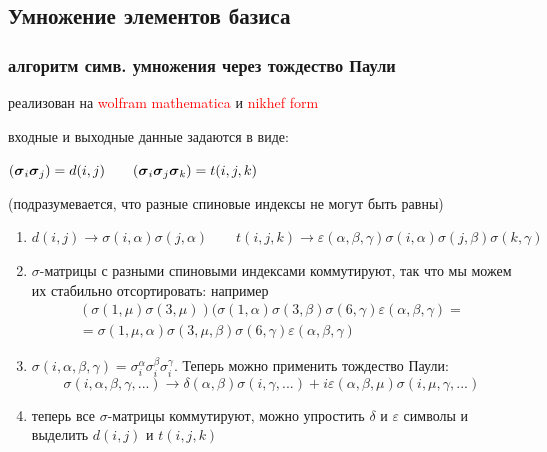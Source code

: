 \documentclass{beamer}
\begin{document}
\subsection{Умножение элементов базиса}
\begin{frame}
\frametitle{алгоритм симв. умножения через тождество Паули}
реализован на \textcolor{red}{wolfram mathematica} и \textcolor{red}{nikhef form}

входные и выходные данные задаются в виде: 

$({\boldsymbol{\sigma}}_i {\boldsymbol{\sigma}}_j) = d(i,j) \qquad ({\boldsymbol{\sigma}}_i {\boldsymbol{\sigma}}_j {\boldsymbol{\sigma}}_k) = t(i,j,k)$

(подразумевается, что разные спиновые индексы не могут быть равны)

\begin{enumerate}
\item 
$d(i,j)\rightarrow\sigma(i,\alpha)\sigma(j,\alpha)\qquad
t(i,j,k)\rightarrow\varepsilon(\alpha,\beta,\gamma)\sigma(i,\alpha)\sigma(j,\beta)\sigma(k,\gamma)$
\item $\sigma$-матрицы с разными спиновыми индексами коммутируют, так что мы можем их стабильно отсортировать:
например
$$\begin{gathered}
(\sigma(1,\mu)\sigma(3,\mu))(\sigma(1,\alpha)\sigma(3,\beta)\sigma(6,\gamma)\varepsilon(\alpha,\beta,\gamma) = \\
=\sigma(1,\mu,\alpha) \sigma(3,\mu,\beta) \sigma(6,\gamma) \varepsilon(\alpha,\beta,\gamma)
\end{gathered}
$$
\item $\sigma(i,\alpha,\beta,\gamma)=\sigma_i^\alpha \sigma_i^\beta \sigma_i^\gamma.$ Теперь можно применить тождество Паули: 
	$$\sigma(i,\alpha,\beta,\gamma,...)\rightarrow
	\delta(\alpha,\beta)\sigma(i,\gamma,...)+i \varepsilon(\alpha,\beta,\mu)\sigma(i,\mu,\gamma,...)$$
\item теперь все $\sigma$-матрицы коммутируют, можно упростить $\delta$ и $\varepsilon$ символы и выделить $d(i,j)$ и $t(i,j,k)$
\end{enumerate}
\end{frame}
\end{document}
